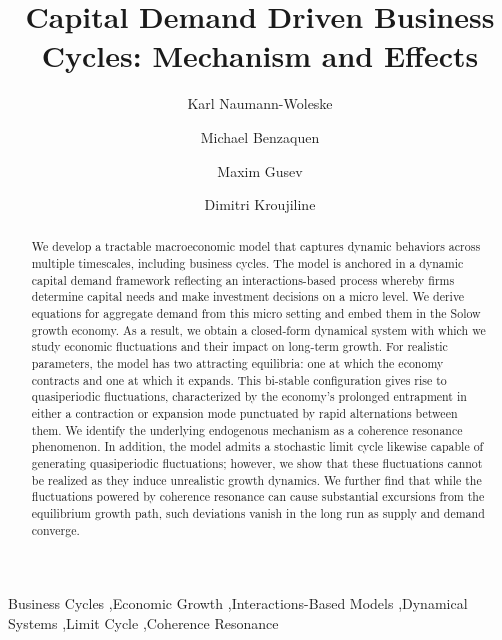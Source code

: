 \documentclass[authoryear, review]{elsarticle}
\begin{document}
\begin{frontmatter}
\title{Capital Demand Driven Business Cycles: Mechanism and Effects} 
\author[1,2,3]{Karl Naumann-Woleske}
\author[1,2,4]{Michael Benzaquen}
\author[5]{Maxim Gusev}
\author[5]{Dimitri Kroujiline}
\address[1]{Chair of Econophysics and Complex Systems, Ecole Polytechnique, 91128 Palaiseau Cedex, France}
\address[2]{LadHyX, UMR CNRS 7646, Ecole Polytechnique, 91128 Palaiseau Cedex, France}
\address[3]{New Approaches to Economic Challenges Unit (NAEC), OECD, 75016 Paris, France}
\address[4]{Capital Fund Management, 75007 Paris, France}
\address[5]{LGT Capital Partners, 8808 Pf\"affikon, Switzerland}


\begin{abstract}

We develop a tractable macroeconomic model that captures dynamic behaviors across multiple timescales, including business cycles. The model is anchored in a dynamic capital demand framework reflecting an interactions-based process whereby firms determine capital needs and make investment decisions on a micro level. We derive equations for aggregate demand from this micro setting and embed them in the Solow growth economy. As a result, we obtain a closed-form dynamical system with which we study economic fluctuations and their impact on long-term growth. For realistic parameters, the model has two attracting equilibria: one at which the economy contracts and one at which it expands. This bi-stable configuration gives rise to quasiperiodic fluctuations, characterized by the economy’s prolonged entrapment in either a contraction or expansion mode punctuated by rapid alternations between them. We identify the underlying endogenous mechanism as a coherence resonance phenomenon. In addition, the model admits a stochastic limit cycle likewise capable of generating quasiperiodic fluctuations; however, we show that these fluctuations cannot be realized as they induce unrealistic growth dynamics. We further find that while the fluctuations powered by coherence resonance can cause substantial excursions from the equilibrium growth path, such deviations vanish in the long run as supply and demand converge.

\end{abstract}

\begin{keyword}
Business Cycles \sep Economic Growth \sep Interactions-Based Models \sep Dynamical Systems \sep Limit Cycle \sep Coherence Resonance 
\end{keyword}
\end{frontmatter}
\newpage
\end{document}
